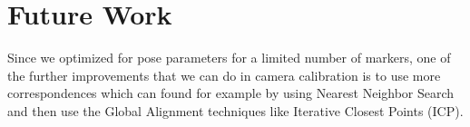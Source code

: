 \documentclass[10pt,twocolumn,letterpaper]{article}
\begin{document}
\section{Future Work}
Since we optimized for pose parameters for a limited number of markers, one of the further improvements that we can do in camera calibration is to use more correspondences which can found for example by using Nearest Neighbor Search and then use the Global Alignment techniques like Iterative Closest Points (ICP).

%
%
\end{document}
